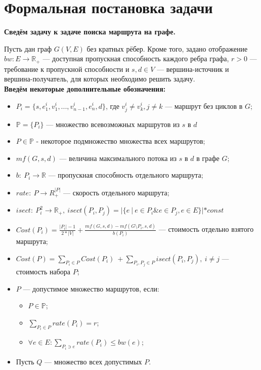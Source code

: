 \documentclass[a4paper]{article}
\begin{document}
\bigskip
\section{Формальная постановка задачи}
\textbf{Сведём задачу к задаче поиска маршрута на графе.} 

Пусть дан граф $G(V, E)$ без кратных рёбер. Кроме того, задано отображение $bw: E \to \mathbb{R}_+$ --- доступная пропускная способность каждого ребра графа, $r>0$ --- требование к пропускной способности и $s, d \in V$ --- вершина-источник и вершина-получатель, для которых необходимо решить задачу.\\
\textbf{Введём некоторые дополнительные обозначения:}
\begin{itemize}

\item $P_i = \{s, e^i_1, v^i_1, ..., v^i_{n-1}, e^i_n, d\}$, где $v^i_j \ne v^i_k, j \ne k$ --- маршрут без циклов в $G$;

\item $\mathbb{P} = \{P_i\}$ --- множество всевозможных маршрутов из $s$ в $d$
\item $P \in \mathbb{P}$ - некоторое подмножество множества всех маршрутов;

\item $mf(G, s, d)$ --- величина максимального потока из $s$ в $d$ в графе $G$;
\item $b:\ P_i \to \mathbb{R}$ --- пропускная способность отдельного маршрута;

\item $rate:\  P \to R^{|P|}_+$ --- скорость отдельного маршрута;

\item $isect:\ P_i^2 \to \mathbb{R}_+,\ isect(P_i, P_j) = |\{e\ |\ e \in P_i \& e \in P_j, e \in E\}|*const$

\item $Cost(P_i) = \frac{|P_i| - 1}{2*|V|} + \frac{mf(G, s, d) - mf(G \setminus P_i, s, d)}{b(P_i)}$ --- стоимость отдельно взятого маршрута;

\item $Cost(P) = \sum\limits_{P_i\in P} Cost(P_i)\ + \sum\limits_{P_i, P_j \in P} isect(P_i, P_j),\ i \ne j$ --- стоимость набора $P$;

\item $P$ --- допустимое множество маршрутов, если:
\begin{itemize}
\item $P\in \mathbb{P}$;
\item $\sum\limits_{P_i\in P} rate(P_i) = r$;
\item $\forall e \in E: \sum\limits_{P_i \ni e} rate(P_i) \le bw(e)$;
\end{itemize}
\item Пусть $Q$ --- множество всех допустимых $P$.
\end{itemize}
\end{document}
